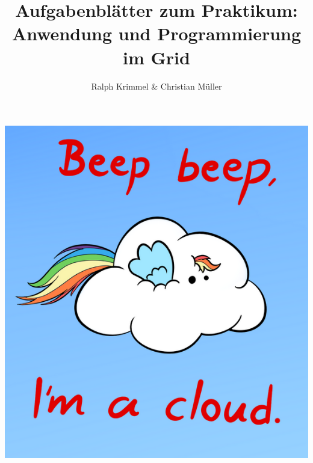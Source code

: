 \documentclass{article}
\title{Aufgabenbl\"atter zum Praktikum: Anwendung und Programmierung im Grid}
\author{Ralph Krimmel \& Christian M\"uller}
\begin{document}
\maketitle{}
\vspace{2cm}
\begin{center}
	\includegraphics[scale=0.4]{logo.png}
\end{center}
\newpage
\tableofcontents
\newpage

\newpage

\newpage

\newpage

\end{document}
